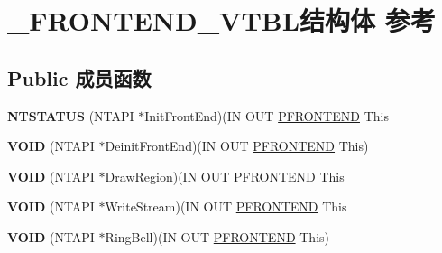 \hypertarget{struct___f_r_o_n_t_e_n_d___v_t_b_l}{}\section{\+\_\+\+F\+R\+O\+N\+T\+E\+N\+D\+\_\+\+V\+T\+B\+L结构体 参考}
\label{struct___f_r_o_n_t_e_n_d___v_t_b_l}
\subsection*{Public 成员函数}
\begin{DoxyCompactItemize}
\item 
\mbox{\label{struct___f_r_o_n_t_e_n_d___v_t_b_l_ad72985e11d647760bdfc9f6ef30a67db}} 
{\bfseries N\+T\+S\+T\+A\+T\+US} (N\+T\+A\+PI $\ast$Init\+Front\+End)(IN O\+UT \hyperlink{struct___f_r_o_n_t_e_n_d}{P\+F\+R\+O\+N\+T\+E\+ND} This
\item 
\mbox{\label{struct___f_r_o_n_t_e_n_d___v_t_b_l_a2d7c8eaae5ac2aff893b8437f480cf67}} 
{\bfseries V\+O\+ID} (N\+T\+A\+PI $\ast$Deinit\+Front\+End)(IN O\+UT \hyperlink{struct___f_r_o_n_t_e_n_d}{P\+F\+R\+O\+N\+T\+E\+ND} This)
\item 
\mbox{\label{struct___f_r_o_n_t_e_n_d___v_t_b_l_ab513e5dbe4486a9dc4bbd8bb32561c4f}} 
{\bfseries V\+O\+ID} (N\+T\+A\+PI $\ast$Draw\+Region)(IN O\+UT \hyperlink{struct___f_r_o_n_t_e_n_d}{P\+F\+R\+O\+N\+T\+E\+ND} This
\item 
\mbox{\label{struct___f_r_o_n_t_e_n_d___v_t_b_l_a87c3b688f61a10afc89e94b9ad26aa09}} 
{\bfseries V\+O\+ID} (N\+T\+A\+PI $\ast$Write\+Stream)(IN O\+UT \hyperlink{struct___f_r_o_n_t_e_n_d}{P\+F\+R\+O\+N\+T\+E\+ND} This
\item 
\mbox{\label{struct___f_r_o_n_t_e_n_d___v_t_b_l_a06ef7284606d390eb9e0e812b4f386bd}} 
{\bfseries V\+O\+ID} (N\+T\+A\+PI $\ast$Ring\+Bell)(IN O\+UT \hyperlink{struct___f_r_o_n_t_e_n_d}{P\+F\+R\+O\+N\+T\+E\+ND} This)
\item 
\mbox{\label{struct___f_r_o_n_t_e_n_d___v_t_b_l_ad0ebd97be60f57c2237da2be2e6b5ad1}} 

\end{DoxyCompactItemize}

